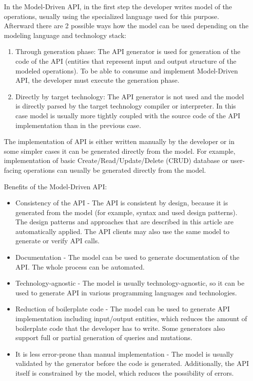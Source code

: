 In the Model-Driven API, in the first step the developer writes model of the operations, usually using the
specialized language used for this purpose.
Afterward there are 2 possible ways how the model can be used depending on the modeling language and technology stack:

\begin{enumerate}
    \item Through generation phase: The API generator is used for generation of the code of the API\@
    (entities that represent input and output structure of the modeled operations).
    To be able to consume and implement Model-Driven API, the developer must execute the generation phase.
    \item Directly by target technology: The API generator is not used and the model is directly parsed
    by the target technology compiler or interpreter.
    In this case model is usually more tightly coupled with the source code of the API implementation
    than in the previous case.
\end{enumerate}

The implementation of API is either written manually by the developer or in some simpler cases it can be generated
directly from the model.
For example, implementation of basic Create/Read/Update/Delete (CRUD) database or user-facing operations can usually
be generated directly from the model.

Benefits of the Model-Driven API:

\begin{itemize}
    \item Consistency of the API - The API is consistent by design, because it is generated from the model
    (for example, syntax and used design patterns).
    The design patterns and approaches that are described in this article are automatically applied.
    The API clients may also use the same model to generate or verify API calls.
    \item Documentation - The model can be used to generate documentation of the API\@.
    The whole process can be automated.
    \item Technology-agnostic - The model is usually technology-agnostic, so it can be used to generate API
    in various programming languages and technologies.
    \item Reduction of boilerplate code - The model can be used to generate API implementation including
    input/output entities, which reduces the amount of boilerplate code that the developer has to write.
    Some generators also support full or partial generation of queries and mutations.
    \item It is less error-prone than manual implementation - The model is usually validated by the generator
    before the code is generated.
    Additionally, the API itself is constrained by the model, which reduces the possibility of errors.
\end{itemize}

